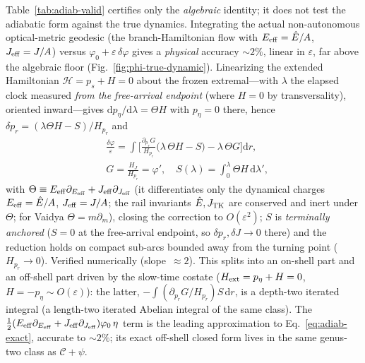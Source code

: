 \documentclass[
    aps, prd, twocolumn, superscriptaddress,
    showpacs, nofootinbib, floatfix
]{revtex4-2}
\newcommand{\Ehat}{\hat E}
\newcommand{\dd}{\mathrm{d}}
\begin{document}
Table~\ref{tab:adiab-valid} certifies only the \emph{algebraic} identity; it does not
test the adiabatic form against the true dynamics. Integrating the actual
non-autonomous optical-metric geodesic (the branch-Hamiltonian flow with
$E_{\rm eff}=\Ehat/A$, $J_{\rm eff}=J/A$) versus $\varphi_0+\varepsilon\,\delta\varphi$
gives a \emph{physical} accuracy $\sim2\%$, linear in $\varepsilon$, far above the
algebraic floor (Fig.~\ref{fig:phi-true-dynamic}). Linearizing the extended
Hamiltonian $\mathcal H=p_s+H=0$ about the frozen extremal---with $\lambda$ the
elapsed clock measured \emph{from the free-arrival endpoint} (where $H=0$ by
transversality), oriented inward---gives $\dd p_\eta/\dd\lambda=\Theta H$ with
$p_\eta=0$ there, hence $\delta p_r=(\lambda\Theta H-S)/H_{p_r}$ and
\begin{equation}
    \begin{aligned}
    &\frac{\delta\varphi}{\varepsilon}=\int\!\Big[\frac{\partial_{p_r}G}{H_{p_r}}
    \big(\lambda\,\Theta H-S\big)-\lambda\,\Theta G\Big]\dd r,\\
    &G=\frac{H_J}{H_{p_r}}=\varphi',\quad
    S(\lambda)=\!\int_0^{\lambda}\!\Theta H\,\dd\lambda',
    \end{aligned}
    \label{eq:adiab-exact}
\end{equation}
with $\Theta\equiv E_{\rm eff}\partial_{E_{\rm eff}}+J_{\rm eff}\partial_{J_{\rm eff}}$
(it differentiates only the dynamical charges $E_{\rm eff}=\Ehat/A$, $J_{\rm eff}=J/A$;
the rail invariants $\Ehat,J_{\rm TK}$ are conserved and inert under $\Theta$; for
Vaidya $\Theta=m\partial_m$),
closing the correction to $O(\varepsilon^2)$; $S$ is \emph{terminally anchored}
($S=0$ at the free-arrival endpoint, so $\delta p_r,\delta J\to0$ there) and the
reduction holds on compact sub-arcs bounded away from the turning point ($H_{p_r}\to0$).
Verified numerically (slope~$\approx2$). This splits into an on-shell part and an
off-shell part driven by the slow-time costate ($H_{\rm ext}=p_\eta+H=0$,
$H=-p_\eta\sim O(\varepsilon)$): the latter, $-\!\int(\partial_{p_r}G/H_{p_r})S\,\dd r$,
is a depth-two iterated integral (a length-two iterated Abelian integral of the same
class). The
$\tfrac12(E_{\rm eff}\partial_{E_{\rm eff}}+J_{\rm eff}\partial_{J_{\rm eff}})\varphi_0\,\eta$
term is the leading approximation to
Eq.~\eqref{eq:adiab-exact}, accurate to $\sim2\%$; its exact off-shell closed form lives
in the same genus-two class as $\mathcal{C}+\psi$.
\end{document}
